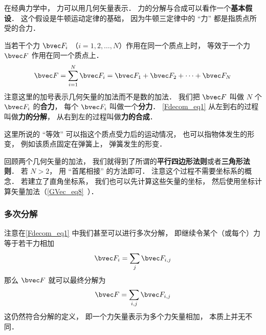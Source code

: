 

在经典力学中， 力可以用几何矢量表示． 力的分解与合成可以看作一个\textbf{基本假设}． 这个假设是牛顿运动定律的基础， 因为牛顿三定律中的 “力” 都是指质点所受的合力．

当若干个力 $\bvec F_i$ （$i = 1, 2, \dots, N$）作用在同一个质点上时， 等效于一个力 $\bvec F$ 作用在同一个质点上．
\begin{equation}\label{Fdecom_eq1}
\bvec F = \sum_{i=1}^N \bvec F_i = \bvec F_1 + \bvec F_2 + \dots + \bvec F_N
\end{equation}
注意这里的加号表示几何矢量的加法而不是数的加法． 我们把 $\bvec F$ 叫做 $N$ 个 $\bvec F_i$ 的\textbf{合力}， 每个 $\bvec F_i$ 叫做一个\textbf{分力}． \autoref{Fdecom_eq1} 从左到右的过程叫做\textbf{力的分解}， 从右到左的过程叫做\textbf{力的合成}．

这里所说的 “等效” 可以指这个质点受力后的运动情况， 也可以指物体发生的形变， 例如该质点固定在弹簧上， 弹簧发生的形变．

回顾两个几何矢量的加法， 我们就得到了所谓的\textbf{平行四边形法则}或者\textbf{三角形法则}． 若 $N > 2$， 用 “首尾相接” 的方法即可． 注意这个过程不需要坐标系的概念． 若建立了直角坐标系， 我们也可以先计算这些矢量的坐标， 然后使用坐标计算矢量加法（\autoref{GVec_eq8}~）．

\subsubsection{多次分解}
注意在\autoref{Fdecom_eq1} 中我们甚至可以进行多次分解， 即继续令某个（或每个）力等于若干力相加
\begin{equation}
\bvec F_i = \sum_j \bvec F_{i,j}
\end{equation}
那么 $\bvec F$ 就可以最终分解为
\begin{equation}
\bvec F = \sum_{i,j} \bvec F_{i,j}
\end{equation}
这仍然符合分解的定义， 即一个力矢量表示为多个力矢量相加， 本质上并无不同．
